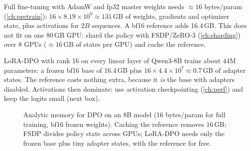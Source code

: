 \begin{napkinmath}
Full fine-tuning with AdamW and fp32 master weights needs $\approx16$ bytes/param
(\cref{ch:pretrain}): $16\times8.19\times10^9\approx131$\,GB of weights, gradients and optimizer
state, plus activations for $2B$ sequences. A bf16 reference adds 16.4\,GB. This does not fit on
one 80\,GB GPU: shard the policy with FSDP/ZeRO-3 (\cref{ch:sharding}) over 8 GPUs ($\approx16$\,GB of
states per GPU) and cache the reference.

LoRA-DPO with rank 16 on every linear layer of Qwen3-8B trains about $44$M parameters: a frozen
bf16 base of 16.4\,GB plus $16\times4.4\times10^7\approx0.7$\,GB of adapter states. The reference
costs nothing extra, because it \emph{is} the base with adapters disabled. Activations then dominate:
use activation checkpointing (\cref{ch:perf}) and keep the logits small (next box).
\end{napkinmath}

\begin{figure}[t]
\centering
{}
\caption{Analytic memory for DPO on an 8B model (16 bytes/param for full training, bf16 frozen
weights). Caching the reference removes 16\,GB; FSDP divides policy state across GPUs; LoRA-DPO
needs only the frozen base plus tiny adapter states, with the reference for free.}
\label{fig:dpo:memory}
\end{figure}

